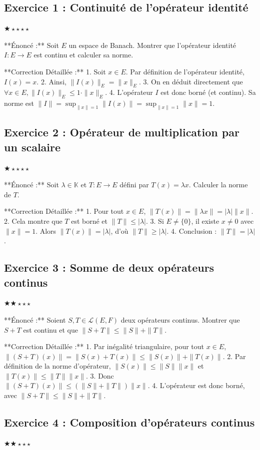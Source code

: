 \documentclass[11pt,a4paper]{article}
\begin{document}
\subsection*{Exercice 1 : Continuité de l'opérateur identité}
$\bigstar\star\star\star\star$

**Énoncé :**
Soit $E$ un espace de Banach. Montrer que l'opérateur identité $I: E \to E$ est continu et calculer sa norme.

**Correction Détaillée :**
1. Soit $x \in E$. Par définition de l'opérateur identité, $I(x) = x$.
2. Ainsi, $\|I(x)\|_E = \|x\|_E$.
3. On en déduit directement que $\forall x \in E, \|I(x)\|_E \le 1 \cdot \|x\|_E$.
4. L'opérateur $I$ est donc borné (et continu). Sa norme est $\|I\| = \sup_{\|x\|=1} \|I(x)\| = \sup_{\|x\|=1} \|x\| = 1$.


\subsection*{Exercice 2 : Opérateur de multiplication par un scalaire}
$\bigstar\star\star\star\star$

**Énoncé :**
Soit $\lambda \in \mathbb{K}$ et $T: E \to E$ défini par $T(x) = \lambda x$. Calculer la norme de $T$.

**Correction Détaillée :**
1. Pour tout $x \in E$, $\|T(x)\| = \|\lambda x\| = |\lambda| \|x\|$.
2. Cela montre que $T$ est borné et $\|T\| \le |\lambda|$.
3. Si $E \neq \{0\}$, il existe $x \neq 0$ avec $\|x\|=1$. Alors $\|T(x)\| = |\lambda|$, d'où $\|T\| \ge |\lambda|$.
4. Conclusion : $\|T\| = |\lambda|$.


\subsection*{Exercice 3 : Somme de deux opérateurs continus}
$\bigstar\bigstar\star\star\star$

**Énoncé :**
Soient $S, T \in \mathcal{L}(E,F)$ deux opérateurs continus. Montrer que $S+T$ est continu et que $\|S+T\| \le \|S\| + \|T\|$.

**Correction Détaillée :**
1. Par inégalité triangulaire, pour tout $x \in E$, $\|(S+T)(x)\| = \|S(x) + T(x)\| \le \|S(x)\| + \|T(x)\|$.
2. Par définition de la norme d'opérateur, $\|S(x)\| \le \|S\| \|x\|$ et $\|T(x)\| \le \|T\| \|x\|$.
3. Donc $\|(S+T)(x)\| \le (\|S\| + \|T\|)\|x\|$.
4. L'opérateur est donc borné, avec $\|S+T\| \le \|S\| + \|T\|$.


\subsection*{Exercice 4 : Composition d'opérateurs continus}
$\bigstar\bigstar\star\star\star$
\end{document}
